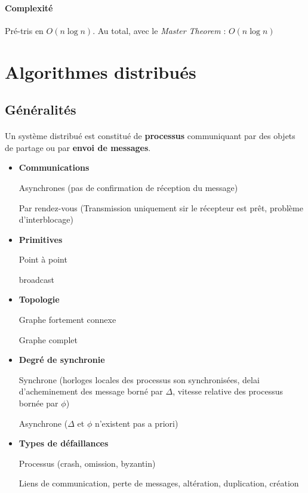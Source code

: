 \documentclass[french]{article}
\begin{document}
\paragraph{Complexité} Pré-tris en $O(n \log n)$. Au total, avec le \emph{Master Theorem} : $O(n \log n)$

\section{Algorithmes distribués}

\subsection{Généralités}

\paragraph{}Un système distribué est constitué de \textbf{processus} communiquant par des objets de partage ou par \textbf{envoi de messages}.\\

\begin{itemize}
	\item \textbf{Communications}
	
	Asynchrones (pas de confirmation de réception du message)
	
	Par rendez-vous (Transmission uniquement sir le récepteur est prêt, problème d'interblocage)
	
	\item \textbf{Primitives} 
	
	Point à point
	
	broadcast
	
	\item \textbf{Topologie}
	
	Graphe fortement connexe
	
	Graphe complet
	
	\item \textbf{Degré de synchronie}
	
	Synchrone (horloges locales des processus son synchronisées, delai d'acheminement des message borné par $\Delta$, vitesse relative des processus bornée par $\phi$)
	
	Asynchrone ($\Delta$ et $\phi$ n'existent pas a priori)
	
	\item \textbf{Types de défaillances}
	
	Processus (crash, omission, byzantin)
	
	Liens de communication, perte de messages, altération, duplication, création
\end{itemize}
\end{document}

